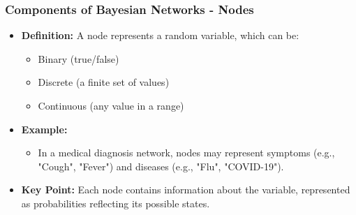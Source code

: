\documentclass[aspectratio=169]{beamer}
\begin{document}
\begin{frame}[fragile]
    \frametitle{Components of Bayesian Networks - Nodes}
    \begin{itemize}
        \item \textbf{Definition:} A node represents a random variable, which can be:
        \begin{itemize}
            \item Binary (true/false)
            \item Discrete (a finite set of values)
            \item Continuous (any value in a range)
        \end{itemize}

        \item \textbf{Example:}
        \begin{itemize}
            \item In a medical diagnosis network, nodes may represent symptoms (e.g., "Cough", "Fever") and diseases (e.g., "Flu", "COVID-19").
        \end{itemize}

        \item \textbf{Key Point:} Each node contains information about the variable, represented as probabilities reflecting its possible states.
    \end{itemize}
\end{frame}
\end{document}
